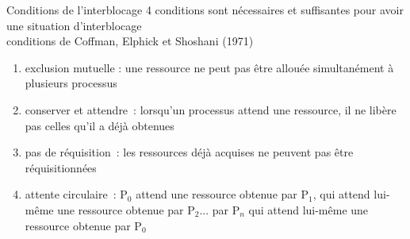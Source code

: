 

\begin {frame} {Conditions de l'interblocage}
    4 conditions sont nécessaires et suffisantes pour avoir une situation
    d'interblocage \\
    \implique conditions de Coffman, Elphick et Shoshani (1971)

    \begin {enumerate}
	\item exclusion mutuelle : une ressource ne peut pas être
	    allouée simultanément à plusieurs processus

	\item conserver et attendre~: lorsqu'un processus attend une
	    ressource, il ne libère pas celles qu'il a déjà obtenues

	\item pas de réquisition~: les ressources déjà acquises ne
	    peuvent pas être réquisitionnées

	\item attente circulaire~: P$_0$ attend une ressource obtenue par
	    P$_1$, qui attend lui-même une ressource obtenue par P$_2$...
	    par P$_n$ qui attend lui-même une ressource obtenue par P$_0$

    \end {enumerate}

\end {frame}

